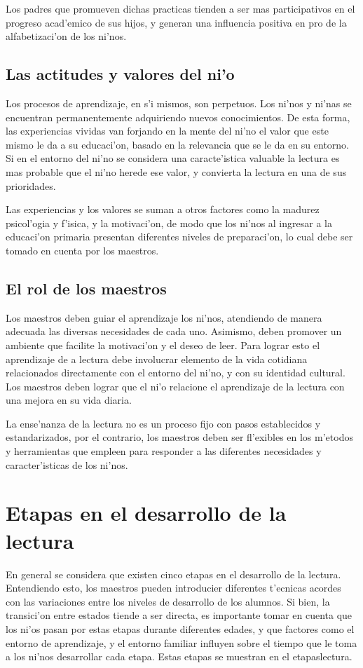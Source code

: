 Los padres que promueven dichas practicas tienden a ser mas participativos en el progreso acad'emico de sus hijos, y generan una influencia positiva en pro de la alfabetizaci'on de los ni'nos.

\subsection{Las actitudes y valores del ni'o}
Los procesos de aprendizaje, en s'i mismos, son perpetuos. Los ni'nos y ni'nas se encuentran permanentemente adquiriendo nuevos conocimientos. De esta forma, las experiencias vividas van forjando en la mente del ni'no el valor que este mismo le da a su educaci'on, basado en la relevancia que se le da en su entorno. Si en el entorno del ni'no se considera una caracte'istica valuable la lectura es mas probable que el ni'no herede ese valor, y convierta la lectura en una de sus prioridades.

Las experiencias y los valores se suman a otros factores como la madurez psicol'ogia y f'isica, y la motivaci'on, de modo que los ni'nos al ingresar a la educaci'on primaria presentan diferentes niveles de preparaci'on, lo cual debe ser tomado en cuenta por los maestros.

\subsection{El rol de los maestros}
Los maestros deben guiar el aprendizaje los ni'nos, atendiendo de manera adecuada las diversas necesidades de cada uno. Asimismo, deben promover un ambiente que facilite la motivaci'on y el deseo de leer. Para lograr esto el aprendizaje de a lectura debe involucrar elemento de la vida cotidiana relacionados directamente con el entorno del ni'no, y con su identidad cultural. Los maestros deben lograr que el ni'o relacione el aprendizaje de la lectura con una mejora en su vida diaria. 

La ense'nanza de la lectura no es un proceso fijo con pasos establecidos y estandarizados, por el contrario, los maestros deben ser fl'exibles en los m'etodos y herramientas que empleen para responder a las diferentes necesidades y caracter'isticas de los ni'nos.

\section{Etapas en el desarrollo de la lectura}
En general se considera que existen cinco etapas en el desarrollo de la lectura. Entendiendo esto, los maestros pueden introducier diferentes t'ecnicas acordes con las variaciones entre los niveles de desarrollo de los alumnos. Si bien, la transici'on entre estados tiende a ser directa, es importante tomar en cuenta que los ni'os pasan por estas etapas durante diferentes edades, y que factores como el entorno de aprendizaje, y el entorno familiar influyen sobre el tiempo que le toma a los ni'nos desarrollar cada etapa. Estas etapas se muestran en el \tablename{etapaslectura}.

